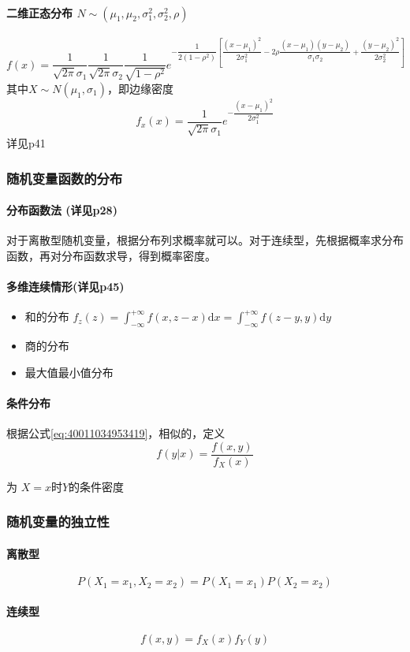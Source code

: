 \paragraph{二维正态分布 $N\sim (\mu_1,\mu_2,\sigma^2_1,\sigma^2_2,\rho )$}
\begin{equation*}
f(x)=\dfrac{1}{\sqrt{2\pi}\sigma_{1}} \dfrac{1}{\sqrt{2\pi}\sigma_{2}}
\dfrac{1}{\sqrt{1-\rho^2}}
e^{
	-\dfrac{1}{2(1-\rho^2)}
	\left[ 
	\dfrac{(x-\mu_{1})^{2}}{2\sigma_{1}^{2}}
	-2\rho\dfrac{(x-\mu_1)(y-\mu_2)}{\sigma_1 \sigma_2}
	+\dfrac{(y-\mu_{2})^{2}}{2\sigma_{2}^{2}}
\right] }
\end{equation*}
其中$X \sim N(\mu_1 ,\sigma_1)$，即边缘密度
\begin{equation*}
f_x(x)=\dfrac{1}{\sqrt{2\pi}\sigma_1}e^{-\dfrac{(x-\mu_1)^{2}}{2\sigma_1^{2}}}
\end{equation*}
详见p41


\subsubsection{随机变量函数的分布}

\paragraph{分布函数法 (详见p28)}
对于离散型随机变量，根据分布列求概率就可以。对于连续型，先根据概率求分布函数，再对分布函数求导，得到概率密度。

\paragraph{多维连续情形(详见p45)}

\begin{itemize}
\item 和的分布 $f_{z}(z) = \int_{-\infty}^{+\infty} f(x,z-x) \mathrm{d}x = \int_{-\infty}^{+\infty} f(z-y,y) \mathrm{d}y$
\item 商的分布
\item 最大值最小值分布
  
\end{itemize}


\paragraph{条件分布}

根据公式\ref{eq:40011034953419}，相似的，定义
\begin{equation*}
  f(y|x)=\dfrac{f(x,y)}{f_{X}(x)}
\end{equation*}

为 $X=x$时$Y$的条件密度

\subsubsection{随机变量的独立性}

\paragraph{离散型}
\begin{equation*}
  P(X_{1}=x_{1},X_{2}=x_{2})=P(X_{1}=x_{1})P(X_{2}=x_{2})
\end{equation*}
\paragraph{连续型}
\begin{equation*}
  f(x,y)=f_{X}(x)f_{Y}(y)
\end{equation*}
